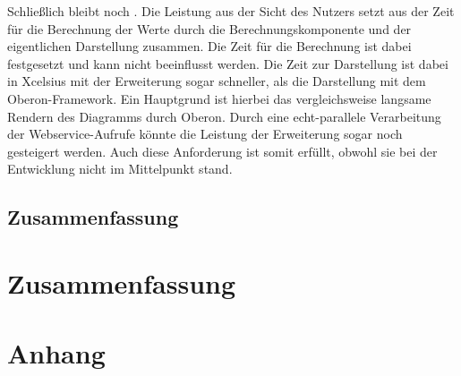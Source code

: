 \begin{onehalfspacing}
Schließlich bleibt noch . Die Leistung aus der Sicht des Nutzers setzt aus der Zeit für die Berechnung der Werte durch die Berechnungskomponente und der eigentlichen Darstellung zusammen. Die Zeit für die Berechnung ist dabei festgesetzt und kann nicht beeinflusst werden. Die Zeit zur Darstellung ist dabei in Xcelsius mit der Erweiterung sogar schneller, als die Darstellung mit dem Oberon-Framework. Ein Hauptgrund ist hierbei das vergleichsweise langsame Rendern des Diagramms durch Oberon. Durch eine echt-parallele Verarbeitung der Webservice-Aufrufe könnte die Leistung der Erweiterung sogar noch gesteigert werden. Auch diese Anforderung ist somit erfüllt, obwohl sie bei der Entwicklung nicht im Mittelpunkt stand.

\section{Zusammenfassung}
\loreIpsum

\chapter{Zusammenfassung}
\loreIpsum

\loreIpsum

\loreIpsum

\loreIpsum

\end{onehalfspacing}


\seAppendix{}

\setcounter{page}{8}

\chapter{Anhang}

